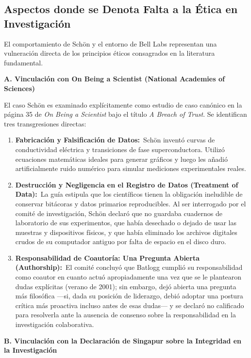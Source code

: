 \documentclass[12pt,a4paper]{article}
\newcommand{\itemlabel}[3]{\textbf{#1#2}~#3}
\begin{document}
\subsection{Aspectos donde se Denota Falta a la Ética en Investigación}
El comportamiento de Schön y el entorno de Bell Labs representan una vulneración directa de los principios éticos consagrados en la literatura fundamental.

\bigskip
\noindent\textbf{A. Vinculación con On Being a Scientist (National Academies of Sciences)}

El caso Schön es examinado explícitamente como estudio de caso canónico en la página 35 de \textit{On Being a Scientist} bajo el título \textit{\textquotedbl{}A Breach of Trust\textquotedbl{}}. Se identifican tres transgresiones directas:
\begin{enumerate}
\item \itemlabel{Fabricación y Falsificación de Datos}{:}{Schön inventó curvas de conductividad eléctrica y transiciones de fase superconductora. Utilizó ecuaciones matemáticas ideales para generar gráficos y luego les añadió artificialmente \textquotedbl{}ruido\textquotedbl{} numérico para simular mediciones experimentales reales.}
\item \itemlabel{Destrucción y Negligencia en el Registro de Datos (Treatment of Data)}{:}{La guía estipula que los científicos tienen la obligación ineludible de conservar bitácoras y datos primarios reproducibles. Al ser interrogado por el comité de investigación, Schön declaró que no guardaba cuadernos de laboratorio de sus experimentos, que había desechado o dejado de usar las muestras y dispositivos físicos, y que había eliminado los archivos digitales crudos de su computador antiguo por falta de espacio en el disco duro.}
\item \itemlabel{Responsabilidad de Coautoría: Una Pregunta Abierta (Authorship)}{:}{El comité concluyó que Batlogg cumplió su responsabilidad como coautor en cuanto actuó apropiadamente una vez que se le plantearon dudas explícitas (verano de 2001); sin embargo, dejó abierta una pregunta más filosófica —si, dada su posición de liderazgo, debió adoptar una postura crítica más proactiva incluso antes de esas dudas— y se declaró no calificado para resolverla ante la ausencia de consenso sobre la responsabilidad en la investigación colaborativa.}
\end{enumerate}
\bigskip
\noindent\textbf{B. Vinculación con la Declaración de Singapur sobre la Integridad en la Investigación}
\end{document}
